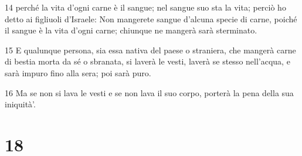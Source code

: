 \par 14 perché la vita d'ogni carne è il sangue; nel sangue suo sta la vita; perciò ho detto ai figliuoli d'Israele: Non mangerete sangue d'alcuna specie di carne, poiché il sangue è la vita d'ogni carne; chiunque ne mangerà sarà sterminato.
\par 15 E qualunque persona, sia essa nativa del paese o straniera, che mangerà carne di bestia morta da sé o sbranata, si laverà le vesti, laverà se stesso nell'acqua, e sarà impuro fino alla sera; poi sarà puro.
\par 16 Ma se non si lava le vesti e se non lava il suo corpo, porterà la pena della sua iniquità'.

\chapter{18}

